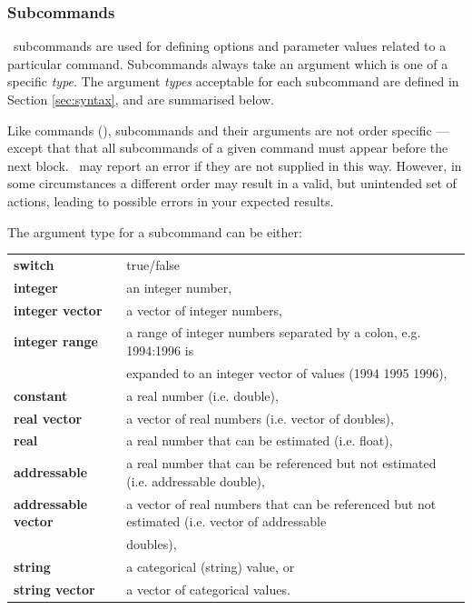 \subsubsection{Subcommands}

\IBM\ subcommands are used for defining options and parameter values related to a particular command. Subcommands always take an argument which is one of a specific \emph{type}. The argument \emph{types} acceptable for each subcommand are defined in Section \ref{sec:syntax}, and are summarised below. 

Like commands (), subcommands and their arguments are not order specific --- except that that all subcommands of a given command must appear before the next  block. \IBM\ may report an error if they are not supplied in this way. However, in some circumstances a different order may result in a valid, but unintended set of actions, leading to possible errors in your expected results.  

The argument type for a subcommand can be either:

\begin{tabular}{ll}
\textbf{switch} & true/false\\ 
\textbf{integer}& an integer number,\\
\textbf{integer vector} & a vector of integer numbers,\\
\textbf{integer range} & a range of integer numbers separated by a colon, e.g. 1994:1996 is \\ & expanded to an integer vector of values (1994 1995 1996),\\
\textbf{constant} & a real number (i.e. double),\\
\textbf{real vector} & a vector of real numbers (i.e. vector of doubles),\\
\textbf{real} & a real number that can be estimated (i.e. float),\\
\textbf{addressable} & a real number that can be referenced but not estimated (i.e. addressable double),\\
\textbf{addressable vector} & a vector of real numbers that can be referenced but not estimated (i.e. vector of addressable \\ & doubles),\\
\textbf{string} & a categorical (string) value, or\\
\textbf{string vector} & a vector of categorical values.
\end{tabular}

